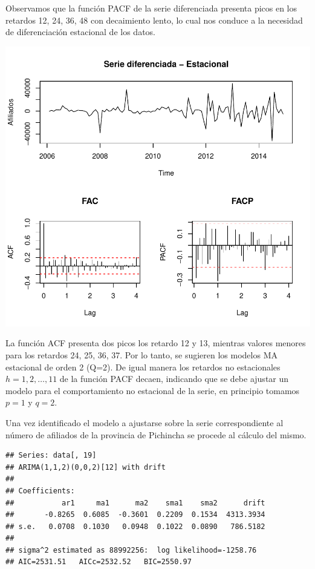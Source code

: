 \documentclass[11pt,a4paper,oneside]{article}\usepackage[]{graphicx}\usepackage[]{color}
\makeatletter
\def\maxwidth{ %
  \ifdim\Gin@nat@width>\linewidth
    \linewidth
  \else
    \Gin@nat@width
  \fi
}
\newenvironment{kframe}{%
 \def\at@end@of@kframe{}%
 \ifinner\ifhmode%
  \def\at@end@of@kframe{\end{minipage}}%
  \begin{minipage}{\columnwidth}%
 \fi\fi%
 \def\FrameCommand##1{\hskip\@totalleftmargin \hskip-\fboxsep
 \colorbox{shadecolor}{##1}\hskip-\fboxsep
     \hskip-\linewidth \hskip-\@totalleftmargin \hskip\columnwidth}%
 \MakeFramed {\advance\hsize-\width
   \@totalleftmargin\z@ \linewidth\hsize
   \@setminipage}}%
 {\par\unskip\endMakeFramed%
 \at@end@of@kframe}
\newenvironment{knitrout}{}{} %
\makeatother
\begin{document}
Observamos que la función PACF de la serie diferenciada presenta picos en los retardos 12, 24, 36, 48 con decaimiento lento, lo cual nos conduce a la necesidad de diferenciación estacional de los datos.

\begin{knitrout}
\color{fgcolor}

{\centering \includegraphics[width=\maxwidth]{figure/unnamed-chunk-13-1} 

}



\end{knitrout}


La función ACF presenta dos picos los retardo 12 y 13, mientras valores menores para los retardos 24, 25, 36, 37. Por lo tanto, se sugieren los modelos MA estacional de orden 2 (Q=2). De igual manera los retardos no estacionales $h=1,2,\ldots, 11$ de la función PACF decaen, indicando que se debe ajustar un modelo  para el comportamiento no estacional de la serie, en principio tomamos $p=1$ y $q=2$.\newline

Una vez identificado el modelo a ajustarse sobre la serie correspondiente al número de afiliados de la provincia de Pichincha se procede al cálculo del mismo.

\begin{knitrout}
\color{fgcolor}\begin{kframe}
\begin{verbatim}
## Series: data[, 19] 
## ARIMA(1,1,2)(0,0,2)[12] with drift         
## 
## Coefficients:
##           ar1     ma1      ma2    sma1    sma2      drift
##       -0.8265  0.6085  -0.3601  0.2209  0.1534  4313.3934
## s.e.   0.0708  0.1030   0.0948  0.1022  0.0890   786.5182
## 
## sigma^2 estimated as 88992256:  log likelihood=-1258.76
## AIC=2531.51   AICc=2532.52   BIC=2550.97
\end{verbatim}
\end{kframe}
\end{knitrout}
\end{document}
